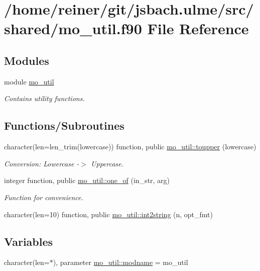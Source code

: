 \hypertarget{mo__util_8f90}{}\section{/home/reiner/git/jsbach.ulme/src/shared/mo\+\_\+util.f90 File Reference}
\label{mo__util_8f90}
\subsection*{Modules}
\begin{DoxyCompactItemize}
\item 
module \hyperlink{namespacemo__util}{mo\+\_\+util}
\begin{DoxyCompactList}\small\item\em Contains utility functions. \end{DoxyCompactList}\end{DoxyCompactItemize}
\subsection*{Functions/\+Subroutines}
\begin{DoxyCompactItemize}
\item 
character(len=len\+\_\+trim(lowercase)) function, public \hyperlink{namespacemo__util_a4a244c25226ff9221cdd725d0964c118}{mo\+\_\+util\+::toupper} (lowercase)
\begin{DoxyCompactList}\small\item\em Conversion\+: Lowercase -\/$>$ Uppercase. \end{DoxyCompactList}\item 
integer function, public \hyperlink{namespacemo__util_a7a24a8dc4b724911d99757348cc8ecbe}{mo\+\_\+util\+::one\+\_\+of} (in\+\_\+str, arg)
\begin{DoxyCompactList}\small\item\em Function for convenience. \end{DoxyCompactList}\item 
character(len=10) function, public \hyperlink{namespacemo__util_a2adc90dbfdafeab9097559d6fd71c06e}{mo\+\_\+util\+::int2string} (n, opt\+\_\+fmt)
\end{DoxyCompactItemize}
\subsection*{Variables}
\begin{DoxyCompactItemize}
\item 
character(len=$\ast$), parameter \hyperlink{namespacemo__util_a4026980f9290fc6203c551efed0cd9e0}{mo\+\_\+util\+::modname} = \textquotesingle{}mo\+\_\+util\textquotesingle{}
\end{DoxyCompactItemize}
